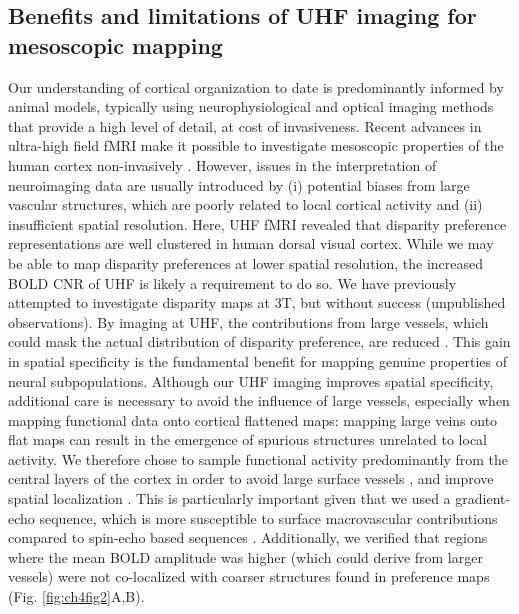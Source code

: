 \subsection{Benefits and limitations of UHF imaging for mesoscopic mapping}
Our understanding of cortical organization to date is predominantly informed by animal models, typically using neurophysiological and optical imaging methods that provide a high level of detail, at cost of invasiveness. Recent advances in ultra-high field fMRI make it possible to investigate mesoscopic properties of the human cortex non-invasively \cite{Cheng:2001fk,Yacoub:2008hr,Zimmermann:2011kl}. However, issues in the interpretation of neuroimaging data are usually introduced by (i) potential biases from large vascular structures, which are poorly related to local cortical activity and (ii) insufficient spatial resolution. Here, UHF fMRI revealed that disparity preference representations are well clustered in human dorsal visual cortex. While we may be able to map disparity preferences at lower spatial resolution, the increased BOLD CNR of UHF is likely a requirement to do so. We have previously attempted to investigate disparity maps at 3T, but without success (unpublished observations). By imaging at UHF, the contributions from large vessels, which could mask the actual distribution of disparity preference, are reduced \cite{Gati:1997uq,Ogawa:1998fk,Ugurbil:2003uq}. This gain in spatial specificity is the fundamental benefit for mapping genuine properties of neural subpopulations.
Although our UHF imaging improves spatial specificity, additional care is necessary to avoid the influence of large vessels, especially when mapping functional data onto cortical flattened maps: mapping large veins onto flat maps can result in the emergence of spurious structures unrelated to local activity. We therefore chose to sample functional activity predominantly from the central layers of the cortex in order to avoid large surface vessels \cite{Zimmermann:2011kl,SanchezPanchuelo:2012jq}, and improve spatial localization \cite{Polimeni:2010fl}. This is particularly important given that we used a gradient-echo sequence, which is more susceptible to surface macrovascular contributions compared to spin-echo based sequences \cite{De-Martino:2013wl}. Additionally, we verified that regions where the mean BOLD amplitude was higher (which could derive from larger vessels) were not co-localized with coarser structures found in preference maps (Fig. \ref{fig:ch4fig2}A,B).
